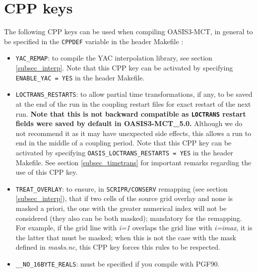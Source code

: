\section{CPP keys}
\label{subsec_cpp}

The following CPP keys can be used when compiling OASIS3-MCT, in general to be specified in the {\tt CPPDEF} variable in the header Makefile :

\begin{itemize}

\item{\tt YAC\_REMAP}: to compile the YAC interpolation library, see section \ref{subsec_interp}. Note that this CPP key can be activated by specifying {\tt ENABLE\_YAC = YES} in the header Makefile.

\item {\tt LOCTRANS\_RESTARTS}: to allow partial time transformations, if any, to be saved at the end of the run in the coupling restart files for exact restart of the next run. {\bf Note that this is not backward compatible as {\tt LOCTRANS} restart fields were saved by default in OASIS3-MCT\_5.0.} Although we do not recommend it as it may have unexpected side effects, this allows a run to end in the middle of a coupling period. Note that this CPP key can be activated by specifying {\tt OASIS\_LOCTRANS\_RESTARTS = YES} in the header Makefile. See section \ref{subsec_timetrans} for important remarks regarding the use of this CPP key.

\item {\tt TREAT\_OVERLAY}:  to ensure, in {\tt SCRIPR/CONSERV}
  remapping (see section \ref{subsec_interp}), that if two cells of
  the source grid overlay and none is masked a priori, the one with the greater numerical
  index will not be considered (they also can be both masked); mandatory
  for the remapping. For example, if the grid line with {\it i=1} overlaps
  the grid line with {\it i=imax}, it is the latter that must be masked;
  when this is not the case with the mask defined in {\it masks.nc},
  this CPP key forces this rules to be respected.

\item {\tt \_\_NO\_16BYTE\_REALS}:  must be specified if you compile
with PGF90.
\end{itemize}


